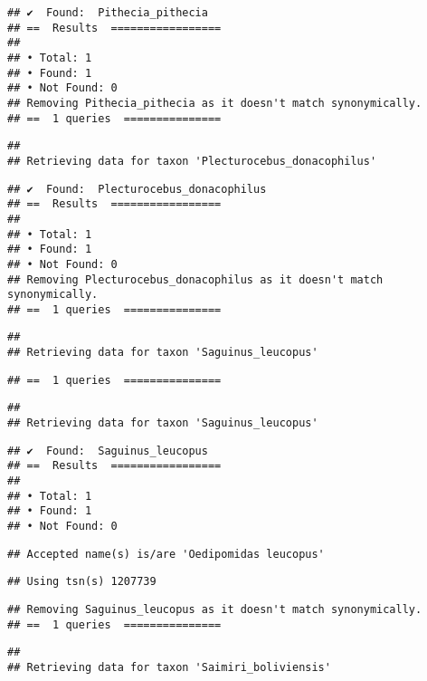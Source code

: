 \documentclass[
]{article}
\begin{document}
\begin{verbatim}
## ✔  Found:  Pithecia_pithecia
## ==  Results  =================
## 
## • Total: 1 
## • Found: 1 
## • Not Found: 0
## Removing Pithecia_pithecia as it doesn't match synonymically.
## ==  1 queries  ===============
\end{verbatim}

\begin{verbatim}
## 
## Retrieving data for taxon 'Plecturocebus_donacophilus'
\end{verbatim}

\begin{verbatim}
## ✔  Found:  Plecturocebus_donacophilus
## ==  Results  =================
## 
## • Total: 1 
## • Found: 1 
## • Not Found: 0
## Removing Plecturocebus_donacophilus as it doesn't match synonymically.
## ==  1 queries  ===============
\end{verbatim}

\begin{verbatim}
## 
## Retrieving data for taxon 'Saguinus_leucopus'
\end{verbatim}

\begin{verbatim}
## ==  1 queries  ===============
\end{verbatim}

\begin{verbatim}
## 
## Retrieving data for taxon 'Saguinus_leucopus'
\end{verbatim}

\begin{verbatim}
## ✔  Found:  Saguinus_leucopus
## ==  Results  =================
## 
## • Total: 1 
## • Found: 1 
## • Not Found: 0
\end{verbatim}

\begin{verbatim}
## Accepted name(s) is/are 'Oedipomidas leucopus'
\end{verbatim}

\begin{verbatim}
## Using tsn(s) 1207739
\end{verbatim}

\begin{verbatim}
## Removing Saguinus_leucopus as it doesn't match synonymically.
## ==  1 queries  ===============
\end{verbatim}

\begin{verbatim}
## 
## Retrieving data for taxon 'Saimiri_boliviensis'
\end{verbatim}
\end{document}
